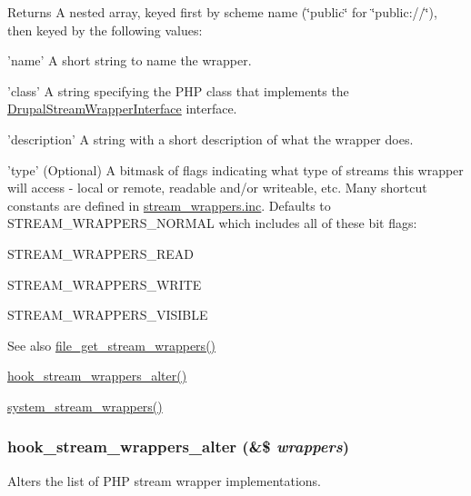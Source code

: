 \begin{DoxyReturn}{Returns}
A nested array, keyed first by scheme name (\char`\"{}public\char`\"{} for \char`\"{}public://\char`\"{}), then keyed by the following values:
\begin{DoxyItemize}
\item 'name' A short string to name the wrapper.
\item 'class' A string specifying the PHP class that implements the \hyperlink{interfaceDrupalStreamWrapperInterface}{DrupalStreamWrapperInterface} interface.
\item 'description' A string with a short description of what the wrapper does.
\item 'type' (Optional) A bitmask of flags indicating what type of streams this wrapper will access -\/ local or remote, readable and/or writeable, etc. Many shortcut constants are defined in \hyperlink{stream__wrappers_8inc}{stream\_\-wrappers.inc}. Defaults to STREAM\_\-WRAPPERS\_\-NORMAL which includes all of these bit flags:
\begin{DoxyItemize}
\item STREAM\_\-WRAPPERS\_\-READ
\item STREAM\_\-WRAPPERS\_\-WRITE
\item STREAM\_\-WRAPPERS\_\-VISIBLE
\end{DoxyItemize}
\end{DoxyItemize}
\end{DoxyReturn}
\begin{DoxySeeAlso}{See also}
\hyperlink{group__file_ga0cd34cfd1bacb36b8ff82d01fb9a6f79}{file\_\-get\_\-stream\_\-wrappers()} 

\hyperlink{group__hooks_gab7e34e537f28b019b04ab1b1d90d52c1}{hook\_\-stream\_\-wrappers\_\-alter()} 

\hyperlink{system_8module_a67821dedc3699910bb2168a40c5d7278}{system\_\-stream\_\-wrappers()} 
\end{DoxySeeAlso}
\hypertarget{group__hooks_gab7e34e537f28b019b04ab1b1d90d52c1}{
\subsubsection[{hook\_\-stream\_\-wrappers\_\-alter}]{\setlength{\rightskip}{0pt plus 5cm}hook\_\-stream\_\-wrappers\_\-alter (\&\$ {\em wrappers})}}
\label{group__hooks_gab7e34e537f28b019b04ab1b1d90d52c1}
Alters the list of PHP stream wrapper implementations.

